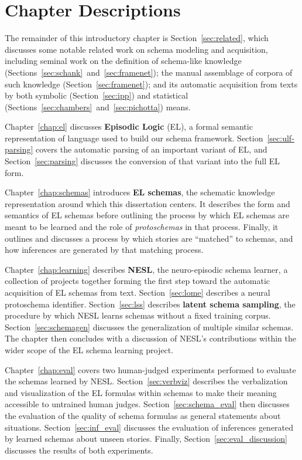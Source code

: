 \section{Chapter Descriptions}
The remainder of this introductory chapter is Section~\ref{sec:related}, which discusses some notable related work on schema modeling and acquisition, including seminal work on the definition of schema-like knowledge (Sections~\ref{sec:schank}~and~\ref{sec:framenet}); the manual assemblage of corpora of such knowledge (Section~\ref{sec:framenet}); and its automatic acquisition from texts by both symbolic (Section~\ref{sec:ipp}) and statistical (Sections~\ref{sec:chambers}~and~\ref{sec:pichotta}) means.

Chapter~\ref{chap:el} discusses \textbf{Episodic Logic} (EL), a formal semantic representation of language used to build our schema framework. Section~\ref{sec:ulf-parsing} covers the automatic parsing of an important variant of EL, and Section~\ref{sec:parsing} discusses the conversion of that variant into the full EL form.

Chapter~\ref{chap:schemas} introduces \textbf{EL schemas}, the schematic knowledge representation around which this dissertation centers. It describes the form and semantics of EL schemas before outlining the process by which EL schemas are meant to be learned and the role of \textit{protoschemas} in that process. Finally, it outlines and discusses a process by which stories are ``matched'' to schemas, and how inferences are generated by that matching process.

Chapter~\ref{chap:learning} describes \textbf{NESL}, the neuro-episodic schema learner, a collection of projects together forming the first step toward the automatic acquisition of EL schemas from text. Section~\ref{sec:lome} describes a neural protoschema identifier. Section~\ref{sec:lss} describes \textbf{latent schema sampling}, the procedure by which NESL learns schemas without a fixed training corpus. Section~\ref{sec:schemagen} discusses the generalization of multiple similar schemas. The chapter then concludes with a discussion of NESL's contributions within the wider scope of the EL schema learning project.

Chapter~\ref{chap:eval} covers two human-judged experiments performed to evaluate the schemas learned by NESL. Section~\ref{sec:verbviz} describes the verbalization and visualization of the EL formulas within schemas to make their meaning accessible to untrained human judges. Section~\ref{sec:schema_eval} then discusses the evaluation of the quality of schema formulas as general statements about situations. Section~\ref{sec:inf_eval} discusses the evaluation of inferences generated by learned schemas about unseen stories. Finally, Section~\ref{sec:eval_discussion} discusses the results of both experiments.